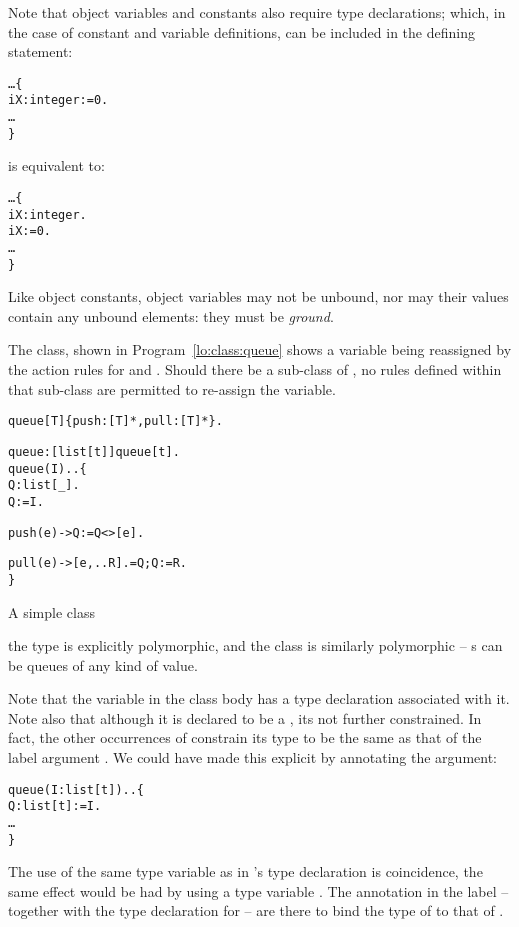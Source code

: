 Note that object variables and constants also require type declarations; which, in the case of constant and variable definitions, can be included in the defining statement:
\begin{alltt}
\ldots\{
  iX:integer := 0.
\ldots
\}
\end{alltt}
is equivalent to:
\begin{alltt}
\ldots\{
  iX:integer.
  iX := 0.
\ldots
\}
\end{alltt}
Like object constants, object variables may not be unbound, nor may their values contain any unbound elements: they must be \emph{ground}.


The  class, shown in Program~\vref{lo:class:queue} shows a variable being reassigned by the action rules for  and . Should there be a sub-class of , no rules defined within that sub-class are permitted to re-assign the  variable.

\begin{program}
\begin{boxed}
\begin{alltt}
queue[T] \impl \{ push:[T]*, pull:[T]* \}.

queue:[list[t]] \sconarrow{} queue[t].
queue(I)..\{
  Q : list[_].
  Q := I.
  
  push(e) -> Q := Q<>[e].
    
  pull(e) -> [e,..R].=Q; Q := R.
\}
\end{alltt}
\end{boxed}
\caption{\label{lo:class:queue}A simple  class}
\end{program}
the  type is explicitly polymorphic, and the  class is similarly polymorphic -- s can be queues of any kind of value.

Note that the variable  in the  class body has a type declaration associated with it. Note also that although it is declared to be a , its not further constrained. In fact, the other occurrences of  constrain its type to be the same as that of the label argument . We could have made this explicit by annotating the argument:
\begin{alltt}
queue(I:list[t])..\{
  Q : list[t] := I.
  \ldots
\}
\end{alltt}
The use of the same type variable  as in 's type declaration is coincidence, the same effect would be had by using a type variable . The annotation in the label -- together with the type declaration for  -- are there to bind the type of  to that of .

